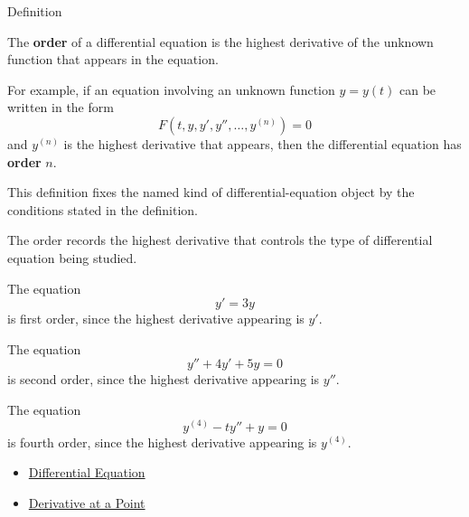 
\begin{definitionbox}{Definition}
\begin{definition}
\label{def:ordinary-differential-equations-terminology-order-of-a-differential-equation}
The \textbf{order} of a differential equation is the highest derivative of the unknown function that appears in the equation.

For example, if an equation involving an unknown function $y=y(t)$ can be written in the form
\[
F(t,y,y',y'',\dots,y^{(n)})=0
\]
and $y^{(n)}$ is the highest derivative that appears, then the differential equation has \textbf{order} $n$.
\end{definition}
\end{definitionbox}

\begin{remark*}
This definition fixes the named kind of differential-equation object by the
conditions stated in the definition.
\end{remark*}

\begin{remark*}[Interpretation]
The order records the highest derivative that controls the type of differential
equation being studied.
\end{remark*}

\begin{remark*}[Examples]
The equation
\[
y'=3y
\]
is first order, since the highest derivative appearing is $y'$.

The equation
\[
y''+4y'+5y=0
\]
is second order, since the highest derivative appearing is $y''$.

The equation
\[
y^{(4)}-t y''+y=0
\]
is fourth order, since the highest derivative appearing is $y^{(4)}$.
\end{remark*}

\begin{dependencies}
\begin{itemize}
  \item \hyperref[def:ordinary-differential-equations-terminology-differential-equation]{Differential Equation}
  \item \hyperref[def:derivative-at-a-point]{Derivative at a Point}
\end{itemize}
\end{dependencies}

